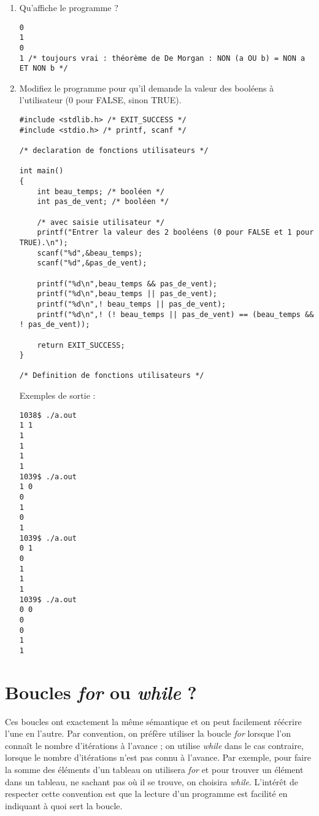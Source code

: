 \begin{enumerate}
\item Qu'affiche le programme ?
  \begin{correction}
\begin{verbatim}
0
1
0
1 /* toujours vrai : théorème de De Morgan : NON (a OU b) = NON a ET NON b */
\end{verbatim}
  \end{correction}

\item Modifiez le programme pour qu'il demande la valeur des booléens
  à l'utilisateur (0 pour FALSE, sinon TRUE).
  \begin{correction}
\begin{verbatim}
#include <stdlib.h> /* EXIT_SUCCESS */
#include <stdio.h> /* printf, scanf */

/* declaration de fonctions utilisateurs */

int main()
{
    int beau_temps; /* booléen */
    int pas_de_vent; /* booléen */

    /* avec saisie utilisateur */
    printf("Entrer la valeur des 2 booléens (0 pour FALSE et 1 pour TRUE).\n");
    scanf("%d",&beau_temps);
    scanf("%d",&pas_de_vent);

    printf("%d\n",beau_temps && pas_de_vent);
    printf("%d\n",beau_temps || pas_de_vent);
    printf("%d\n",! beau_temps || pas_de_vent);
    printf("%d\n",! (! beau_temps || pas_de_vent) == (beau_temps && ! pas_de_vent));

    return EXIT_SUCCESS;
}

/* Definition de fonctions utilisateurs */
\end{verbatim}

Exemples de sortie :
\begin{verbatim}
1038$ ./a.out
1 1
1
1
1
1
1039$ ./a.out
1 0
0
1
0
1
1039$ ./a.out
0 1
0
1
1
1
1039$ ./a.out
0 0
0
0
1
1
\end{verbatim}
  \end{correction}
\end{enumerate}

\section{Boucles \textit{for} ou \textit{while} ?}

Ces boucles ont exactement la même sémantique et on peut facilement
réécrire l'une en l'autre. Par convention, on préfère utiliser la
boucle \textit{for} lorsque l'on connaît le nombre d'itérations à
l'avance ; on utilise \textit{while} dans le cas contraire, lorsque le nombre
d'itérations n'est pas connu à l'avance. Par exemple, pour faire la
somme des éléments d'un tableau on utilisera \textit{for} et pour
trouver un élément dans un tableau, ne sachant pas où il se trouve, on
choisira \textit{while}. L'intérêt de respecter cette convention est
que la lecture d'un programme est facilité en indiquant à quoi sert la
boucle.

